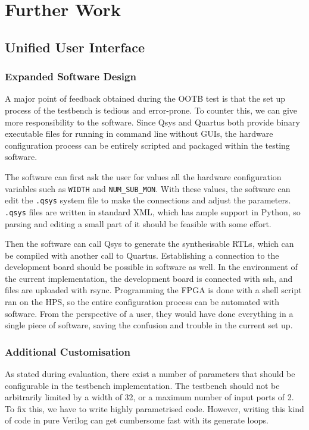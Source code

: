 \chapter{Further Work}

\section{Unified User Interface}
\subsection{Expanded Software Design}
A major point of feedback obtained during the OOTB test is that the set up process of the testbench is tedious and error-prone.
To counter this, we can give more responsibility to the software.
Since Qsys and Quartus both provide binary executable files for running in command line without GUIs, the hardware configuration process can be entirely scripted and packaged within the testing software.

The software can first ask the user for values all the hardware configuration variables such as \texttt{WIDTH} and \texttt{NUM\_SUB\_MON}.
With these values, the software can edit the \texttt{.qsys} system file to make the connections and adjust the parameters.
\texttt{.qsys} files are written in standard XML, which has ample support in Python, so parsing and editing a small part of it should be feasible with some effort.

Then the software can call Qsys to generate the synthesisable RTLs, which can be compiled with another call to Quartus.
Establishing a connection to the development board should be possible in software as well.
In the environment of the current implementation, the development board is connected with ssh, and files are uploaded with rsync.
Programming the FPGA is done with a shell script ran on the HPS, so the entire configuration process can be automated with software.
From the perspective of a user, they would have done everything in a single piece of software, saving the confusion and trouble in the current set up.

\subsection{Additional Customisation}
As stated during evaluation, there exist a number of parameters that should be configurable in the testbench implementation.
The testbench should not be arbitrarily limited by a width of 32, or a maximum number of input ports of 2.
To fix this, we have to write highly parametrised code.
However, writing this kind of code in pure Verilog can get cumbersome fast with its generate loops.


